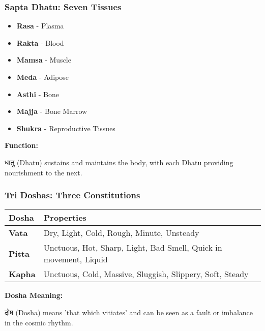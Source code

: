 \begin{frame}[fragile]\frametitle{Sapta Dhatu: Seven Tissues}
    \begin{itemize}
        \item \textbf{Rasa} - Plasma
        \item \textbf{Rakta} - Blood
        \item \textbf{Mamsa} - Muscle
        \item \textbf{Meda} - Adipose
        \item \textbf{Asthi} - Bone
        \item \textbf{Majja} - Bone Marrow
        \item \textbf{Shukra} - Reproductive Tissues
    \end{itemize}
    \vspace{0.5cm}
    \textbf{Function:} 
    
    धातु (Dhatu) sustains and maintains the body, with each Dhatu providing nourishment to the next.
    
\end{frame}

\begin{frame}[fragile]\frametitle{Tri Doshas: Three Constitutions}
    \begin{tabular}{|l|l|}
    \hline
    \textbf{Dosha} & \textbf{Properties} \\
    \hline
    \textbf{Vata} & Dry, Light, Cold, Rough, Minute, Unsteady \\
    \hline
    \textbf{Pitta} & Unctuous, Hot, Sharp, Light, Bad Smell, Quick in movement, Liquid \\
    \hline
    \textbf{Kapha} & Unctuous, Cold, Massive, Sluggish, Slippery, Soft, Steady \\
    \hline
    \end{tabular}
    \vspace{0.5cm}
    \textbf{Dosha Meaning:}
    
    दोष (Dosha) means 'that which vitiates' and can be seen as a fault or imbalance in the cosmic rhythm.
    
\end{frame}

